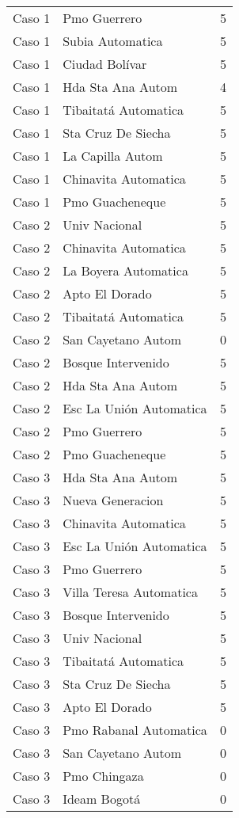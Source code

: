 \begin{itemize}
\begin{longtable}{lll}
Caso 1 & Pmo Guerrero  & 5 \\
Caso 1 & Subia Automatica  & 5 \\
Caso 1 & Ciudad Bolívar  & 5 \\
Caso 1 & Hda Sta Ana Autom  & 4 \\
Caso 1 & Tibaitatá Automatica  & 5 \\
Caso 1 & Sta Cruz De Siecha  & 5 \\
Caso 1 & La Capilla Autom  & 5 \\
Caso 1 & Chinavita Automatica  & 5 \\
Caso 1 & Pmo Guacheneque  & 5 \\
Caso 2 & Univ Nacional  & 5 \\
Caso 2 & Chinavita Automatica  & 5 \\
Caso 2 & La Boyera Automatica  & 5 \\
Caso 2 & Apto El Dorado  & 5 \\
Caso 2 & Tibaitatá Automatica  & 5 \\
Caso 2 & San Cayetano Autom   & 0 \\
Caso 2 & Bosque Intervenido    & 5 \\
Caso 2 & Hda Sta Ana Autom  & 5 \\
Caso 2 & Esc La Unión Automatica & 5 \\
Caso 2 & Pmo Guerrero  & 5 \\
Caso 2 & Pmo Guacheneque  & 5 \\
Caso 3 & Hda Sta Ana Autom  & 5 \\
Caso 3 & Nueva Generacion  & 5 \\
Caso 3 & Chinavita Automatica  & 5 \\
Caso 3 & Esc La Unión Automatica & 5 \\
Caso 3 & Pmo Guerrero  & 5 \\
Caso 3 & Villa Teresa Automatica  & 5 \\
Caso 3 & Bosque Intervenido    & 5 \\
Caso 3 & Univ Nacional  & 5 \\
Caso 3 & Tibaitatá Automatica  & 5 \\
Caso 3 & Sta Cruz De Siecha  & 5 \\
Caso 3 & Apto El Dorado  & 5 \\
Caso 3 & Pmo Rabanal Automatica   & 0 \\
Caso 3 & San Cayetano Autom   & 0 \\
Caso 3 & Pmo Chingaza  & 0 \\
Caso 3 & Ideam Bogotá  & 0 \\

\end{longtable}
\end{itemize}
